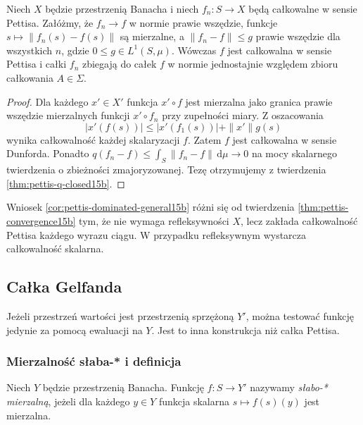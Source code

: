 \begin{wniosek}
\label{cor:pettis-dominated-general15b}
Niech $X$ będzie przestrzenią Banacha i niech $f_n:S\to X$
będą całkowalne w sensie Pettisa. Załóżmy, że $f_n\to f$
w normie prawie wszędzie, funkcje $s\mapsto\|f_n(s)-f(s)\|$
są mierzalne, a $\|f_n-f\|\le g$ prawie wszędzie
dla wszystkich $n$, gdzie $0\le g\in L^1(S,\mu)$.
Wówczas $f$ jest całkowalna w sensie Pettisa i całki
$f_n$ zbiegają do całek $f$ w normie jednostajnie
względem zbioru całkowania $A\in\Sigma$.
\end{wniosek}
\begin{proof}
Dla każdego $x'\in X'$ funkcja $x'\circ f$ jest
mierzalna jako granica prawie wszędzie mierzalnych
funkcji $x'\circ f_n$ przy zupełności miary.
Z oszacowania
\[
 |x'(f(s))|\le|x'(f_1(s))|+\|x'\|g(s)
\]
wynika całkowalność każdej skalaryzacji $f$.
Zatem $f$ jest całkowalna w sensie Dunforda.
Ponadto
$q(f_n-f)\le\int_S\|f_n-f\|\,\mathrm d\mu\to0$
na mocy skalarnego twierdzenia o zbieżności zmajoryzowanej.
Tezę otrzymujemy z twierdzenia \ref{thm:pettis-q-closed15b}.
\end{proof}

Wniosek \ref{cor:pettis-dominated-general15b} różni się
od twierdzenia \ref{thm:pettis-convergence15b} tym, że nie
wymaga refleksywności $X$, lecz zakłada całkowalność
Pettisa każdego wyrazu ciągu. W przypadku refleksywnym
wystarcza całkowalność skalarna.

\subsection{Całka Gelfanda}

Jeżeli przestrzeń wartości jest przestrzenią sprzężoną $Y'$,
można testować funkcję jedynie za pomocą ewaluacji na $Y$.
Jest to inna konstrukcja niż całka Pettisa.

\subsubsection{Mierzalność słaba-* i definicja}

\begin{definicja}
\label{def:weakstar-measurable15b}
Niech $Y$ będzie przestrzenią Banacha. Funkcję $f:S\to Y'$
nazywamy \emph{słabo-* mierzalną}, jeżeli dla każdego $y\in Y$
funkcja skalarna $s\mapsto f(s)(y)$ jest mierzalna.
\end{definicja}


